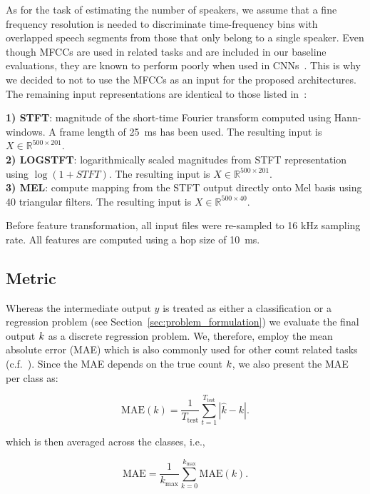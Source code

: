 As for the task of estimating the number of speakers, we assume that a fine frequency resolution is needed to discriminate time-frequency bins with overlapped speech segments from those that only belong to a single speaker.
Even though MFCCs are used in related tasks and are included in our baseline evaluations, they are known to perform poorly when used in CNNs~\cite{Seltzer13}.
This is why we decided to not to use the MFCCs as an input for the proposed architectures.
The remaining input representations are identical to those listed in~\cite{stoeter17}:

\noindent\textbf{1) STFT}: magnitude of the short-time Fourier transform computed using Hann-windows.
A frame length of 25~ms has been used.
The resulting input is \(X \in \mathbb{R}^{500 \times 201}\).\\
\textbf{2) LOGSTFT}: logarithmically scaled magnitudes from STFT representation using \(\log(1 + STFT)\).
The resulting input is \(X \in \mathbb{R}^{500 \times 201}\).\\
\textbf{3) MEL}: compute mapping from the STFT output directly onto Mel basis using 40 triangular filters.
The resulting input is \(X \in \mathbb{R}^{500 \times 40}\).
\par
Before feature transformation, all input files were re-sampled to 16 kHz sampling rate. All features are computed using a hop size of 10~ms.

\subsection{Metric}%
\label{ssec:metrics}

Whereas the intermediate output \(y\) is treated as either a classification or a regression problem (see Section~\ref{sec:problem_formulation}) we evaluate the final output \(k \) as a discrete regression problem.
We, therefore, employ the mean absolute error (MAE) which is also commonly used for other count related tasks (c.f.~\cite{zhang15, Rezatofigh16}).
Since the MAE depends on the true count \(k \), we also present the MAE per class as:

\begin{equation}
  \mbox{MAE}(k) = \frac{1}{T_{\textrm{test}}} \sum_{t=1}^{T_\textrm{test}}\left| \hat{k} - k \right|.
\end{equation}

which is then averaged across the classes, i.e.,

\begin{equation}
  \mbox{MAE} = \frac{1}{k_{\max}} \sum_{k=0}^{k_{\max}} \mbox{MAE}(k).
\end{equation}

